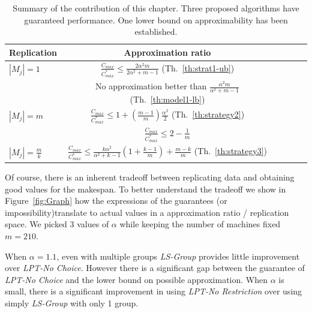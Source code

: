 \documentclass[12pt]{article}
\theoremstyle{mystyle}
\begin{document}
     \begin{table}[ht]
       \centering
       \begin{tabular}{|l|c|c|c|c|c|}
         \hline
         Replication & Approximation ratio  \\
         \hline
         $|M_j|=1$ & $\frac{C_{max}}{C_{max}^{*}}\leq \frac{2\alpha^{2}m}{2\alpha^{2}+ m-1}$ (Th.~\ref{th:strat1-ub})  \\
         & No approximation better than $\frac{\alpha^{2}m }{\alpha^{2} + m-1}$ (Th.~\ref{th:model1-lb})   \\
         
         \hline
         $|M_j|=m$ & $\frac{C_{max}}{C_{max}^{*}} \leq 1 + (\frac{m-1}{m})\frac{\alpha^{2}}{2}$ (Th.~\ref{th:strategy2})  \\
         & $\frac{C_{max}}{C_{max}^{*}} \leq 2-\frac{1}{m}$ \cite{Graham66}   \\
         \hline
         
         $|M_j|= \frac{m}{k} $ & $\frac{C_{max}}{C_{max}^{*}} \leq \frac{k\alpha^{2}}{\alpha^{2}+k-1} \left(1+ {\frac{k-1}{m}} \right)+ {\frac{m-k}{m}}$ (Th.~\ref{th:strategy3})  \\
         
         \hline
       \end{tabular}
       \caption{Summary of the contribution of this chapter.
         Three proposed algorithms have guaranteed performance.
         One lower bound on approximability has been established.}
       \label{tab:template}
     \end{table}
     
     
     Of course, there is an inherent tradeoff between replicating data and   obtaining good values for the makespan. To better understand the   tradeoff we show in Figure~\ref{fig:Graph} how the expressions of the   guarantees (or impossibility)translate to actual values in a  approximation ratio / replication space.  We picked 3 values of   $\alpha$ while keeping the number of machines fixed $m=210$. 
     
     When $\alpha=1.1$, even with multiple groups {\it LS-Group} provides little improvement over {\it LPT-No Choice}. However there is a significant  gap between the guarantee of {\it LPT-No Choice} and the lower bound  on possible approximation. When $\alpha$ is small, there is a  significant improvement in using {\it LPT-No Restriction} over using  simply {\it LS-Group} with only 1 group.
     
\end{document}
